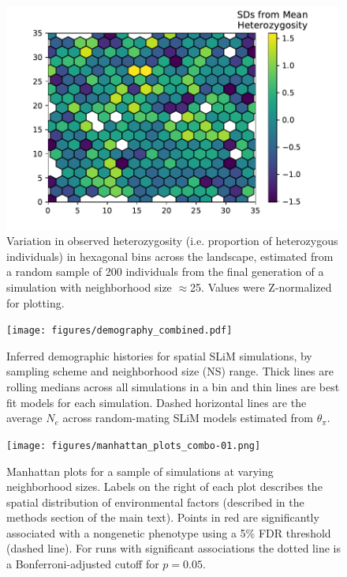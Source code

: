 \documentclass[10pt,twoside,lineno,hidelinks]{preprint}
\begin{document}
\begin{figure}[p]
\centering
\includegraphics[]{figures/het_z_by_ind.pdf}
\caption{Variation in observed heterozygosity (i.e. proportion of heterozygous individuals) in hexagonal bins across the landscape, estimated from a random sample of 200 individuals from the final generation of a simulation with neighborhood size $\approx$25. Values were Z-normalized for plotting.}
\label{fig:hetmap}
\end{figure}
\FloatBarrier

\begin{figure}[p]
\centering
\texttt{[image: figures/demography\_combined.pdf]}
\caption{Inferred demographic histories for spatial SLiM simulations, by sampling scheme and neighborhood size (NS) range. Thick lines are rolling medians across all simulations in a bin and thin lines are best fit models for each simulation. Dashed horizontal lines are the average $N_{e}$ across random-mating SLiM models estimated from $\theta_{\pi}$.}
\label{fig:demography_supplement}
\end{figure}
\FloatBarrier

\afterpage{\clearpage}
\begin{figure}[p]
\centering
\texttt{[image: figures/manhattan\_plots\_combo-01.png]}
\caption{Manhattan plots for a sample of simulations at varying neighborhood sizes. Labels on the right of each plot describes the spatial distribution of environmental factors (described in the methods section of the main text). Points in red are significantly associated with a nongenetic phenotype using a 5\% FDR threshold (dashed line). For runs with significant associations the dotted line is a Bonferroni-adjusted cutoff for $p=0.05$.}
\label{fig:manhattan_plots}
\end{figure}
\FloatBarrier
\end{document}
